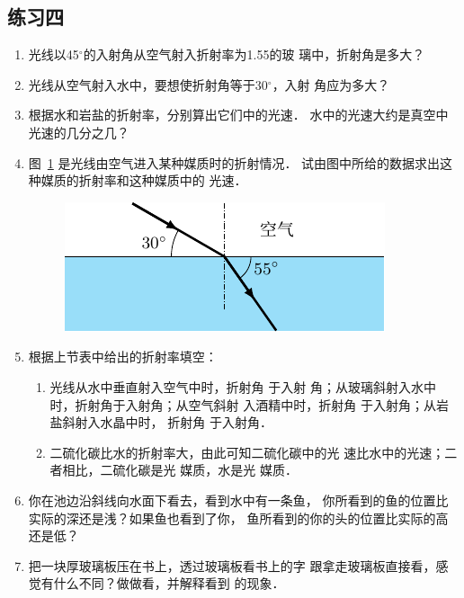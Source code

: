 \subsection*{练习四}
\begin{enumerate}
    \item 光线以45$^\circ$的入射角从空气射入折射率为1.55的玻
璃中，折射角是多大？
\item 光线从空气射入水中，要想使折射角等于30$^\circ$，入射
角应为多大？
\item 根据水和岩盐的折射率，分别算出它们中的光速．
水中的光速大约是真空中光速的几分之几？
\item 图~\ref{fig_C_5-22} 是光线由空气进入某种媒质时的折射情况．
试由图中所给的数据求出这种媒质的折射率和这种媒质中的
光速．
\begin{figure}[htbp]
    \centering
    \includegraphics{fig/C/5-22.pdf}
    \caption{}\label{fig_C_5-22}
\end{figure}

    \item 根据上节表中给出的折射率填空：
    \begin{enumerate}
        \item 光线从水中垂直射入空气中时，折射角\underline{\qquad}
    于入射
    角；从玻璃斜射入水中时，折射角\underline{\qquad}于入射角；从空气斜射
    入酒精中时，折射角\underline{\qquad}
    于入射角；从岩盐斜射入水晶中时，
    折射角\underline{\qquad}
    于入射角．
    \item 二硫化碳比水的折射率大，由此可知二硫化碳中的光
    速比水中的光速\underline{\qquad}；二者相比，二硫化碳是光\underline{\qquad}
    媒质，水是光\underline{\qquad}
    媒质．
    \end{enumerate}
    
    \item 你在池边沿斜线向水面下看去，看到水中有一条鱼，
    你所看到的鱼的位置比实际的深还是浅？如果鱼也看到了你，
    鱼所看到的你的头的位置比实际的高还是低？
    \item 把一块厚玻璃板压在书上，透过玻璃板看书上的字
    跟拿走玻璃板直接看，感觉有什么不同？做做看，并解释看到
    的现象．
\end{enumerate}

